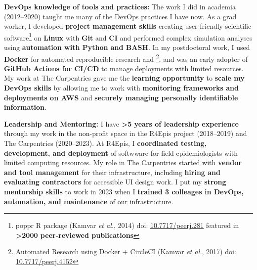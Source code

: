 \textbf{DevOps knowledge of tools and practices:}
The work I did in academia (2012--2020) taught me many of the DevOps practices I have now.
As a grad worker, I developed \textbf{project management skills} creating user-friendly scientific software\footnote{poppr R package (Kamvar \textit{et al.}, 2014) doi: \href{https://doi.org/10.7717/peerj.281}{10.7717/peerj.281} featured in \textbf{\textgreater2000 peer-reviewed publications}} on \textbf{Linux} with \textbf{Git} and \textbf{CI} and 
performed complex simulation analyses using \textbf{automation with Python and BASH}.
In my postdoctoral work, I used \textbf{Docker} for automated reproducible research and \footnote{Automated Research using Docker + CircleCI (Kamvar \textit{et al.}, 2017) doi: \href{https://doi.org/10.7717/peerj.4152}{10.7717/peerj.4152}}, 
and was an early adopter of \textbf{GitHub Actions for CI/CD} to manage deployments with limited resources.
My work at The Carpentries gave me the \textbf{learning opportunity} to \textbf{scale my DevOps skills} by allowing me to work with \textbf{monitoring frameworks and deployments on AWS} and \textbf{securely managing personally identifiable information}.





\vspace{2ex}

\textbf{Leadership and Mentoring:}
I have \textbf{\textgreater5 years of leadership experience} through my work in the non-profit space in the R4Epis project (2018--2019) and The Carpentries (2020--2023).
At R4Epis, I \textbf{coordinated testing, development, and deployment} of softwware for field epidemiologists with limited computing resources.
My role in The Carpentries started with \textbf{vendor and tool management} for their infrastructure, including \textbf{hiring and evaluating contractors} for accessible UI design work.
I put my \textbf{strong mentorship skills} to work in 2023 when I \textbf{trained 3 colleages in DevOps, automation, and maintenance} of our infrastructure.

